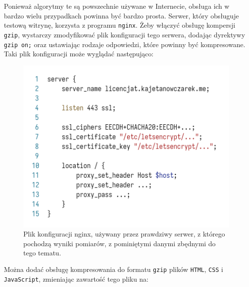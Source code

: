 \documentclass[licencjacka]{pracadypl}
\begin{document}
Ponieważ algorytmy te są powszechnie używane w Internecie, obsługa ich w bardzo wielu przypadkach powinna być bardzo prosta. Serwer, który obsługuje testową witrynę, korzysta z programu \texttt{nginx}. Żeby włączyć obsługę kompersji \texttt{gzip}, wystarczy zmodyfikować plik konfiguracji tego serwera, dodając dyrektywy \texttt{gzip on;} oraz ustawiając rodzaje odpowiedzi, które powinny być kompresowane. Taki plik konfiguracji może wyglądać następująco:
\begin{figure}[H]
  \centering
  \includegraphics[width=\linewidth/\real{1.55}]{images/code-nginx-conf-trunc-nogzip.png}
  \caption{Plik konfiguracji nginx, używany przez prawdziwy serwer, z którego pochodzą wyniki pomiarów, z pominiętymi danymi zbędnymi do tego tematu.}
  \label{fig:nginx-before-gzip}
\end{figure}
Można dodać obsługę kompresowania do formatu \texttt{gzip} plików \texttt{HTML}, \texttt{CSS} i \texttt{JavaScript}, zmieniając zawartość tego pliku na:
\end{document}
